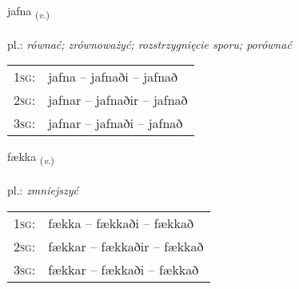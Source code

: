 \documentclass[frontgrid, backgrid]{flacards}\usepackage[]{graphicx}\usepackage[]{xcolor}
\begin{document}
\renewcommand{\flhead}{\vskip5pt \fboxsep=0pt {\small\bfseries\footnotesize Sagnorð | Verb}}
\renewcommand{\fcfoot}{\vskip5pt \fboxsep=0pt \hspace{2pt}{\small\bfseries\footnotesize 2K}}

\renewcommand{\blhead}{\vskip5pt {\small\bfseries\footnotesize Sagnorð | Verb }}
\renewcommand{\bcfoot}{\vskip5pt \hspace{2pt}{\small\bfseries\footnotesize 2K}}


{jafna \small{\textsubscript{(\textit{v.})}} \\[1ex] %
\textphonetic{[japna]} \\
pl.: \emph{równać; zrównoważyć; rozstrzygnięcie sporu; porównać} \\  [2ex]
\renewcommand*{\arraystretch}{0.8}
\begin{tabular}{p{1cm}l}
\textsc{1sg}: & jafna -- jafnaði -- jafnað \\ 
\textsc{2sg}: & jafnar -- jafnaðir -- jafnað \\ 
\textsc{3sg}: & jafnar -- jafnaði -- jafnað \\ 
\end{tabular}
}

\renewcommand{\flhead}{\vskip5pt \fboxsep=0pt {\small\bfseries\footnotesize Sagnorð | Verb}}
\renewcommand{\fcfoot}{\vskip5pt \fboxsep=0pt \hspace{2pt}{\small\bfseries\footnotesize 2K}}

\renewcommand{\blhead}{\vskip5pt {\small\bfseries\footnotesize Sagnorð | Verb }}
\renewcommand{\bcfoot}{\vskip5pt \hspace{2pt}{\small\bfseries\footnotesize 2K}}


{fækka \small{\textsubscript{(\textit{v.})}} \\[1ex] %
\textphonetic{[faihka]} \\
pl.: \emph{zmniejszyć} \\  [2ex]
\renewcommand*{\arraystretch}{0.8}
\begin{tabular}{p{1cm}l}
\textsc{1sg}: & fækka -- fækkaði -- fækkað \\ 
\textsc{2sg}: & fækkar -- fækkaðir -- fækkað \\ 
\textsc{3sg}: & fækkar -- fækkaði -- fækkað \\ 
\end{tabular}
}
\end{document}
